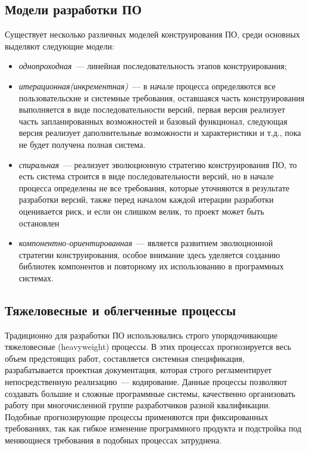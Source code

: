 \subsection{Модели разработки ПО}
Существует несколько различных моделей конструирования ПО, 
среди основных выделяют следующие модели:
\begin{itemize}
  \item {\em однопроходная}~--- линейная последовательность 
этапов конструирования;
  \item {\em итерационная(инкрементная)}~--- в начале процесса определяются 
все пользовательские и системные требования, оставшаяся 
часть конструирования выполняется в виде последовательности версий, 
первая версия реализует часть запланированных возможностей 
и базовый функционал, следующая версия реализует даполнительные 
возможности и характеристики и т.д., пока не будет получена 
полная система. 
  \item {\em спиральная}~--- реализует эволюционную стратегию 
конструирования ПО, то есть система строится в виде последовательности 
версий, но в начале процесса определены не все требования, которые 
уточняются в результате разработки версий, также перед началом 
каждой итерации разработки оценивается риск, и если он слишком велик, 
то проект может быть остановлен
  \item {\em компонентно-ориентированная}~--- является развитием 
эволюционной стратегии конструирования, особое внимание здесь уделяется 
созданию библиотек компонентов и повторному их использованию 
в программных системах.
\end{itemize}

\subsection{Тяжеловесные и облегченные процессы}
Традиционно для разработки ПО использовались строго упорядочивающие 
тяжеловесные (heavyweight) процессы. В этих процессах прогнозируется 
весь объем предстоящих работ, составляется системная спецификация, 
разрабатывается проектная документация, которая строго регламентирует 
непосредственную реализацию~--- кодирование. Данные процессы 
позволяют создавать большие и сложные программные системы, 
качественно организовать работу при многочисленной группе 
разработчиков разной квалификации. Подобные прогнозирующие 
процессы применяются при фиксированных требованиях, 
так как гибкое изменение программного продукта и подстройка 
под меняющиеся требования в подобных процессах затруднена.

